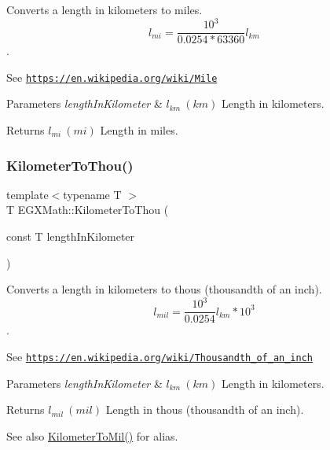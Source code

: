 Converts a length in kilometers to miles. \[ l_{mi}=\frac{10^{3}}{0.0254 * 63360} l_{km} \]. 

See \href{https://en.wikipedia.org/wiki/Mile}{\tt https\+://en.\+wikipedia.\+org/wiki/\+Mile} 
\begin{DoxyParams}{Parameters}
{\em length\+In\+Kilometer} & $ l_{km}\ (km)$ Length in kilometers. \\
\hline
\end{DoxyParams}
\begin{DoxyReturn}{Returns}
$ l_{mi}\ (mi)$ Length in miles. 
\end{DoxyReturn}
\mbox{\label{group___e_g_x_math-_conversions-_length_conversions-_kilometer-_imperial_gabcd7d2e467bc0e80c61257ba641d0f48}} 
\subsubsection{\texorpdfstring{Kilometer\+To\+Thou()}{KilometerToThou()}}
{\footnotesize\ttfamily template$<$typename T $>$ \\
T E\+G\+X\+Math\+::\+Kilometer\+To\+Thou (\begin{DoxyParamCaption}\item[{const T}]{length\+In\+Kilometer }\end{DoxyParamCaption})}



Converts a length in kilometers to thous (thousandth of an inch). \[ l_{mil}= \frac{10^{3}}{0.0254} l_{km} * 10^{3} \]. 

See \href{https://en.wikipedia.org/wiki/Thousandth_of_an_inch}{\tt https\+://en.\+wikipedia.\+org/wiki/\+Thousandth\+\_\+of\+\_\+an\+\_\+inch} 
\begin{DoxyParams}{Parameters}
{\em length\+In\+Kilometer} & $ l_{km}\ (km)$ Length in kilometers. \\
\hline
\end{DoxyParams}
\begin{DoxyReturn}{Returns}
$ l_{mil}\ (mil)$ Length in thous (thousandth of an inch). 
\end{DoxyReturn}
\begin{DoxySeeAlso}{See also}
\mbox{\hyperlink{group___e_g_x_math-_conversions-_length_conversions-_kilometer-_imperial_ga4d25c16818235ceaad64d1119e23e01f}{Kilometer\+To\+Mil()}} for alias. 
\end{DoxySeeAlso}
\mbox{\label{group___e_g_x_math-_conversions-_length_conversions-_kilometer-_imperial_ga98f724c96246bb6dcb517fc64ff5ade1}} 
